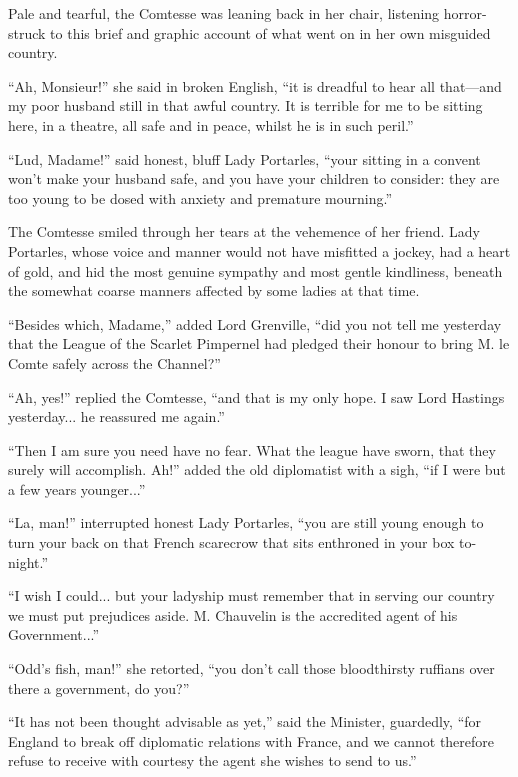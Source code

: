 \documentclass[paper=a5,BCOR=7mm,twoside,DIV=calc,12pt,usegeometry,chapterprefix,endperiod,headings=big]{scrbook}
\begin{document}
Pale and tearful, the Comtesse was leaning back in her chair, listening horror-struck to this brief and graphic account of what went on in her own misguided country.

\enquote{Ah, Monsieur!} she said in broken English, \enquote{it is dreadful to hear all that---and my poor husband still in that awful country. It is terrible for me to be sitting here, in a theatre, all safe and in peace, whilst he is in such peril.}

\enquote{Lud, Madame!} said honest, bluff Lady Portarles, \enquote{your sitting in a convent won't make your husband safe, and you have your children to consider: they are too young to be dosed with anxiety and premature mourning.}

The Comtesse smiled through her tears at the vehemence of her friend. Lady Portarles, whose voice and manner would not have misfitted a jockey, had a heart of gold, and hid the most genuine sympathy and most gentle kindliness, beneath the somewhat coarse manners affected by some ladies at that time.

\enquote{Besides which, Madame,} added Lord Grenville, \enquote{did you not tell me yesterday that the League of the Scarlet Pimpernel had pledged their honour to bring M. le Comte safely across the Channel?}

\enquote{Ah, yes!} replied the Comtesse, \enquote{and that is my only hope. I saw Lord Hastings yesterday... he reassured me again.}

\enquote{Then I am sure you need have no fear. What the league have sworn, that they surely will accomplish. Ah!} added the old diplomatist with a sigh, \enquote{if I were but a few years younger...}

\enquote{La, man!} interrupted honest Lady Portarles, \enquote{you are still young enough to turn your back on that French scarecrow that sits enthroned in your box to-night.}

\enquote{I wish I could... but your ladyship must remember that in serving our country we must put prejudices aside. M. Chauvelin is the accredited agent of his Government...}

\enquote{Odd's fish, man!} she retorted, \enquote{you don't call those bloodthirsty ruffians over there a government, do you?}

\enquote{It has not been thought advisable as yet,} said the Minister, guardedly, \enquote{for England to break off diplomatic relations with France, and we cannot therefore refuse to receive with courtesy the agent she wishes to send to us.}
\end{document}
